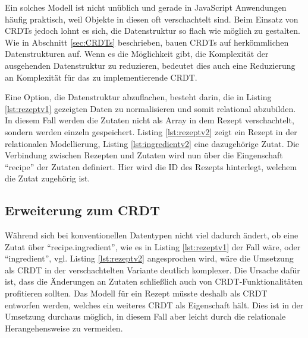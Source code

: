\documentclass[a4paper, 12pt]{scrreprt}
\begin{document}

\begin{minipage}{\linewidth}
	
\end{minipage} 

Ein solches Modell ist nicht unüblich und gerade in JavaScript Anwendungen häufig praktisch, weil Objekte in diesen oft verschachtelt sind. Beim Einsatz von \acp{CRDT} jedoch lohnt es sich, die Datenstruktur so flach wie möglich zu gestalten. Wie in Abschnitt \ref{sec:CRDTs} beschrieben, bauen \acp{CRDT} auf herkömmlichen Datenstrukturen auf. Wenn es die Möglichkeit gibt, die Komplexität der ausgehenden Datenstruktur zu reduzieren, bedeutet dies auch eine Reduzierung an Komplexität für das zu implementierende CRDT.

Eine Option, die Datenstruktur abzuflachen, besteht darin, die in Listing \ref{lst:rezeptv1} gezeigten Daten zu normalisieren und somit relational abzubilden. In diesem Fall werden die Zutaten nicht als Array in dem Rezept verschachtelt, sondern werden einzeln gespeichert. Listing \ref{lst:rezeptv2} zeigt ein Rezept in der relationalen Modellierung, Listing \ref{lst:ingredientv2} eine dazugehörige Zutat. Die Verbindung zwischen Rezepten und Zutaten wird nun über die Eingenschaft \enquote{recipe} der Zutaten definiert. Hier wird die ID des Rezepts hinterlegt, welchem die Zutat zugehörig ist.


\begin{minipage}{\linewidth}
	
\end{minipage}

\begin{minipage}{\linewidth}

\end{minipage}

\subsection{Erweiterung zum CRDT}
\label{sec:erweiterungCRDT}
Während sich bei konventionellen Datentypen nicht viel dadurch ändert, ob eine Zutat über \enquote{recipe.ingredient}, wie es in Listing \ref{lst:rezeptv1} der Fall wäre, oder \enquote{ingredient}, vgl. Listing \ref{lst:rezeptv2} angesprochen wird, wäre die Umsetzung als CRDT in der verschachtelten Variante deutlich komplexer. Die Ursache dafür ist, dass die Änderungen an Zutaten schließlich auch von CRDT-Funktionalitäten profitieren sollten. Das Modell für ein Rezept müsste deshalb als CRDT entworfen werden, welches ein weiteres CRDT als Eigenschaft hält. Dies ist in der Umsetzung durchaus möglich, in diesem Fall aber leicht durch die relationale Herangehensweise zu vermeiden.
\end{document}
